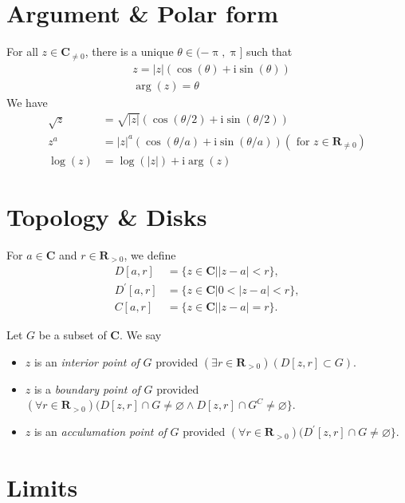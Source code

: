 \documentclass[letterpaper,landscape,9pt,fleqn]{extarticle}
\newcommand{\reals}{\mathbf{R}}
\newcommand{\complex}{\mathbf{C}}
\newcommand{\im}{\mathrm{i}}
\begin{document}
\begin{multicols*}{3}
\section*{Argument \& Polar form}
For all \(z \in \complex_{\neq 0}\), there is a unique \(\theta \in (-\uppi, \uppi]\) such that
\begin{alignat*}{1}
   &z = |z| (\cos(\theta) + \im \sin(\theta)) \\
   &\arg(z) = \theta
\end{alignat*}
We have
\begin{alignat*}{1}
  \sqrt{z} &= \sqrt{|z|} (\cos(\theta/2) + \im \sin(\theta/2)) \\
  z^a &= |z|^a  (\cos(\theta/a) + \im \sin(\theta/a))  (\mbox{ for } z \in \reals_{\neq 0}) \\
  \log(z) &= \log(|z|) + \im \arg(z)
\end{alignat*}

\section*{Topology \& Disks}
For $a \in \complex$ and $r \in \reals_{>0}$, we define
\begin{align*}
  D[a,r] &= \{z \in \complex | |z-a| < r \}, \\
  D^\prime[a,r] &= \{z \in \complex | 0 < |z-a| < r \}, \\
  C[a,r] &= \{z \in \complex | |z-a| = r \}.
\end{align*}

Let $G$ be a subset of $\complex$. We say 
\begin{itemize}
  \item $z$ is an \emph{interior point of} $G$ provided
  \((\exists r \in \reals_{>0})(D[z,r] \subset G) \).

  \item $z$ is a \emph{boundary point of} $G$ provided
  \((\forall r \in \reals_{>0})(D[z,r] \cap G \neq \varnothing \land
  D[z,r] \cap G^C \neq \varnothing \}\).

  \item $z$ is an \emph{acculumation point of} $G$ provided
  \((\forall r \in \reals_{>0})(D^\prime [z,r] \cap G \neq \varnothing \}\).

  
\end{itemize}

\section*{Limits}


\end{multicols*}
\end{document}
